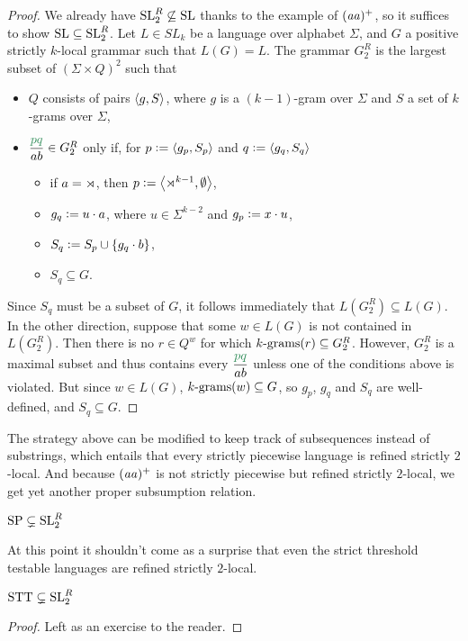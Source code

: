 \begin{proof}
    We already have $\SL_2^R \not\subseteq \SL$ thanks to the example of $(\String{aa})^+$, so it suffices to show $\SL \subseteq \SL_2^R$.
    Let $L \in SL_k$ be a language over alphabet $\Sigma$, and $G$ a positive strictly $k$-local grammar such that $L(G) = L$.
    The grammar $G_2^R$ is the largest subset of $(\Sigma \times Q)^2$ such that
    \begin{itemize}
        \item $Q$ consists of pairs $\tuple{g,S}$, where $g$ is a $(k-1)$-gram over $\Sigma$ and $S$ a set of $k$-grams over $\Sigma$,
        \item $\kState{pq}{ab} \in G_2^R$ only if, for $p \is \tuple{g_p,S_p}$ and $q \is \tuple{g_q,S_q}$
            \begin{itemize}
                \item if $a = \LeftEdge$, then $p \is \tuple{\LeftEdge^{k-1}, \emptyset}$,
                \item $g_q \is u \cdot a$, where $u \in \Sigma^{k-2}$ and $g_p \is x \cdot u$,
                \item $S_q \is S_p \cup \setof{g_q \cdot b}$,
                \item $S_q \subseteq G$.
            \end{itemize}
    \end{itemize}
    
    Since $S_q$ must be a subset of $G$, it follows immediately that $L(G^R_2) \subseteq L(G)$. 
    In the other direction, suppose that some $w \in L(G)$ is not contained in $L(G^R_2)$.
    Then there is no $r \in Q^w$ for which $\Bigrams[k](r) \subseteq G^R_2$.
    However, $G^R_2$ is a maximal subset and thus contains every $\kState{pq}{ab}$ unless one of the conditions above is violated.
    But since $w \in L(G)$, $\Bigrams[k](w) \subseteq G$, so $g_p$, $g_q$ and $S_q$ are well-defined, and $S_q \subseteq G$.
\end{proof}

The strategy above can be modified to keep track of subsequences instead of substrings, which entails that every strictly piecewise language is refined strictly $2$-local.
And because $(\String{aa})^+$ is not strictly piecewise but refined strictly $2$-local, we get yet another proper subsumption relation.
%
\begin{lemma}
    $\SP \subsetneq \SL_2^R$
\end{lemma}
%
At this point it shouldn't come as a surprise that even the strict threshold testable languages are refined strictly $2$-local.
%
\begin{lemma}
    $\STT \subsetneq \SL_2^R$
\end{lemma}
%
\begin{proof}
    Left as an exercise to the reader.
\end{proof}

